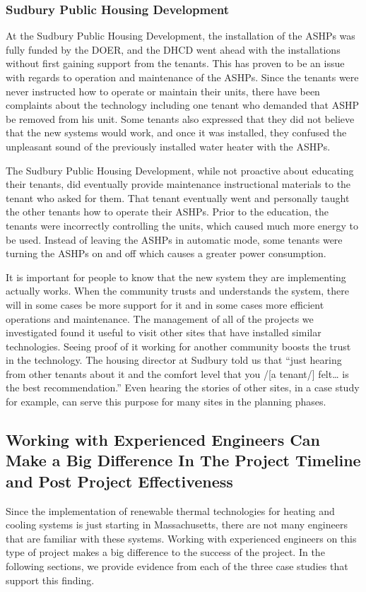 \subsubsection{Sudbury Public Housing Development}
\par At the Sudbury Public Housing Development, the installation of the ASHPs was fully funded by the DOER, and the DHCD went ahead with the installations without first gaining support from the tenants. This has proven to be an issue with regards to operation and maintenance of the ASHPs. Since the tenants were never instructed how to operate or maintain their units, there have been complaints about the technology including one tenant who demanded that ASHP be removed from his unit. Some tenants also expressed that they did not believe that the new systems would work, and once it was installed, they confused the unpleasant sound of the previously installed water heater with the ASHPs.
\par The Sudbury Public Housing Development, while not proactive about educating their tenants, did eventually provide maintenance instructional materials to the tenant who asked for them. That tenant eventually went and personally taught the other tenants how to operate their ASHPs. Prior to the education, the tenants were incorrectly controlling the units, which caused much more energy to be used. Instead of leaving the ASHPs in automatic mode, some tenants were turning the ASHPs on and off which causes a greater power consumption.
\par It is important for people to know that the new system they are implementing actually works. When the community trusts and understands the system, there will in some cases be more support for it and in some cases more efficient operations and maintenance. The management of all of the projects we investigated found it useful to visit other sites that have installed similar technologies. Seeing proof of it working for another community boosts the trust in the technology. The housing director at Sudbury told us that “just hearing from other tenants about it and the comfort level that you /[a tenant/] felt… is the best recommendation.” Even hearing the stories of other sites, in a case study for example, can serve this purpose for many sites in the planning phases.

\subsection{Working with Experienced Engineers Can Make a Big Difference In The Project Timeline and Post Project Effectiveness}
\par Since the implementation of renewable thermal technologies for heating and cooling systems is just starting in Massachusetts, there are not many engineers that are familiar with these systems. Working with experienced engineers on this type of project makes a big difference to the success of the project. In the following sections, we provide evidence from each of the three case studies that support this finding.

